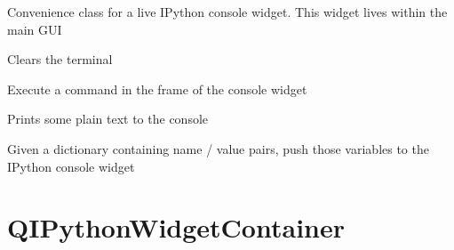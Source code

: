 \documentclass[letterpaper,10pt,english]{sphinxmanual}
\begin{document}
\begin{fulllineitems}
\label{QIPythonWidget:Ipython.QIPythonWidget}
Convenience class for a live IPython console widget.
This widget lives within the main GUI

\begin{fulllineitems}
\label{QIPythonWidget:Ipython.QIPythonWidget.clearTerminal}
Clears the terminal

\end{fulllineitems}


\begin{fulllineitems}
\label{QIPythonWidget:Ipython.QIPythonWidget.executeCommand}
Execute a command in the frame of the console widget

\end{fulllineitems}


\begin{fulllineitems}
\label{QIPythonWidget:Ipython.QIPythonWidget.printText}
Prints some plain text to the console

\end{fulllineitems}


\begin{fulllineitems}
\label{QIPythonWidget:Ipython.QIPythonWidget.pushVariables}
Given a dictionary containing name / value pairs,
push those variables to the IPython console widget

\end{fulllineitems}


\end{fulllineitems}



\section{QIPythonWidgetContainer}
\label{QIPythonWidgetContainer:qipythonwidgetcontainer}\label{QIPythonWidgetContainer::doc}
\end{document}
